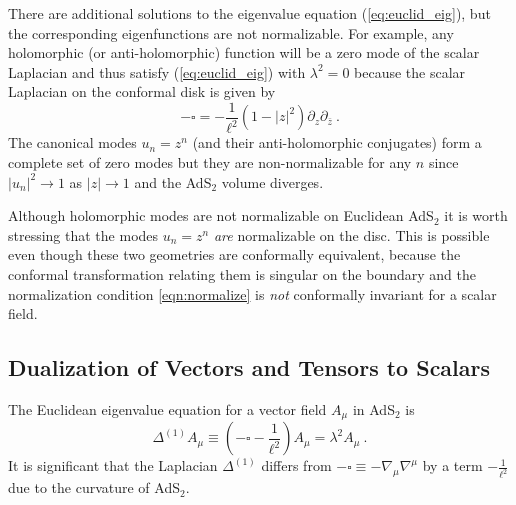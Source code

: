 \documentclass[12pt]{article}
\newcommand{\bz}{\bar{z}}
\begin{document}
There are additional solutions to the eigenvalue equation (\ref{eq:euclid_eig}), but the corresponding eigenfunctions are not normalizable.  For example, any holomorphic (or anti-holomorphic) function will be a zero mode of the scalar Laplacian and thus satisfy (\ref{eq:euclid_eig}) with $\lambda^2 = 0$ because the scalar Laplacian on the conformal disk is given by
%
\begin{equation}
	-\square = -\frac{1}{\ell^2}\left(1 - |z|^2\right) \partial_z \partial_{\bz}~.
\end{equation}
%
The canonical modes $u_n = z^n$ (and their anti-holomorphic conjugates) form a complete set of zero modes but they are non-normalizable for any $n$
since $|u_n|^2 \to 1$ as $|z| \to 1$ and the AdS$_2$ volume diverges. 

Although holomorphic modes are not normalizable on Euclidean AdS$_2$ it is worth stressing that the modes $u_n = z^n$ {\it are} normalizable on the disc. This is possible even though these two geometries are conformally equivalent,
because the conformal transformation relating them is singular on the boundary and the normalization condition \eqref{eqn:normalize} is {\it not} conformally invariant for a scalar field. 

\subsection{Dualization of Vectors and Tensors to Scalars}
\label{sec:quant:dual}

The Euclidean eigenvalue equation for a vector field $A_\mu$ in AdS$_2$ is
\begin{equation}
	\Delta^{(1)} A_\mu \equiv \left(-\square - \frac{1}{\ell^2}\right) A_\mu = \lambda^2 A_\mu~.
\label{eq:eig_vector}
\end{equation}
It is significant that the Laplacian $\Delta^{(1)}$ differs from $-\square \equiv - \nabla_\mu \nabla^\mu$ by a term $-\frac{1}{\ell^2}$ due to the curvature of AdS$_2$.
\end{document}
